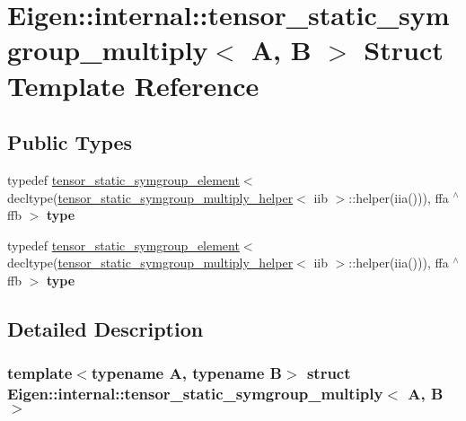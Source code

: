 \hypertarget{struct_eigen_1_1internal_1_1tensor__static__symgroup__multiply}{}\section{Eigen\+:\+:internal\+:\+:tensor\+\_\+static\+\_\+symgroup\+\_\+multiply$<$ A, B $>$ Struct Template Reference}
\label{struct_eigen_1_1internal_1_1tensor__static__symgroup__multiply}
\subsection*{Public Types}
\begin{DoxyCompactItemize}
\item 
\mbox{\label{struct_eigen_1_1internal_1_1tensor__static__symgroup__multiply_a85f5df8449b76b981e0668d37f7a9df5}} 
typedef \hyperlink{struct_eigen_1_1internal_1_1tensor__static__symgroup__element}{tensor\+\_\+static\+\_\+symgroup\+\_\+element}$<$ decltype(\hyperlink{struct_eigen_1_1internal_1_1tensor__static__symgroup__multiply__helper}{tensor\+\_\+static\+\_\+symgroup\+\_\+multiply\+\_\+helper}$<$ iib $>$\+::helper(iia())), ffa $^\wedge$ ffb $>$ {\bfseries type}
\item 
\mbox{\label{struct_eigen_1_1internal_1_1tensor__static__symgroup__multiply_a85f5df8449b76b981e0668d37f7a9df5}} 
typedef \hyperlink{struct_eigen_1_1internal_1_1tensor__static__symgroup__element}{tensor\+\_\+static\+\_\+symgroup\+\_\+element}$<$ decltype(\hyperlink{struct_eigen_1_1internal_1_1tensor__static__symgroup__multiply__helper}{tensor\+\_\+static\+\_\+symgroup\+\_\+multiply\+\_\+helper}$<$ iib $>$\+::helper(iia())), ffa $^\wedge$ ffb $>$ {\bfseries type}
\end{DoxyCompactItemize}


\subsection{Detailed Description}
\subsubsection*{template$<$typename A, typename B$>$\newline
struct Eigen\+::internal\+::tensor\+\_\+static\+\_\+symgroup\+\_\+multiply$<$ A, B $>$}



